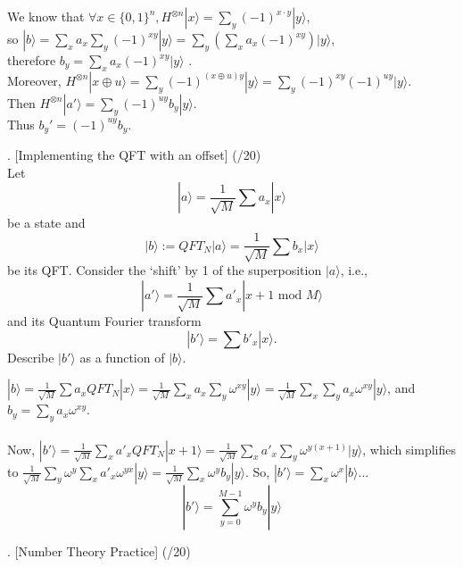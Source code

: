 \documentclass[11pt]{article}
\newenvironment{solution}{\begin{mdframed}[skipabove=\baselineskip,innertopmargin=\baselineskip,innerbottommargin=\baselineskip]
  }{\end{mdframed}}
\begin{document}
\begin{solution}
We know that $\forall x \in \{0,1\}^n,  H^{\otimes n}|x\rangle=\sum_y (-1)^{x\cdot y}|y\rangle$, \\ 
so $|b\rangle = \sum_x a_x \sum_y (-1)^{x y}|y\rangle 
= \sum_y (\sum_x a_x (-1)^{x y})|y\rangle$, \\
therefore $b_y = \sum_x a_x (-1)^{x y}|y\rangle$
. \vspace{2em} \\
Moreover, $H^{\otimes n}|x\oplus u\rangle = \sum_y (-1)^{(x\oplus u)y}|y\rangle = 
\sum_y (-1)^{xy}(-1)^{uy}|y\rangle$. \\
Then $H^{\otimes n}|a'\rangle = \sum_y (-1)^{uy}b_y|y\rangle$. \\ 
Thus $b_y' = (-1)^{uy}b_y$.

\end{solution}

\newpage

. [Implementing the QFT with an offset] (/20)
\\
Let
$$|a\rangle = \frac{1}{\sqrt{M}}\sum a_x|x\rangle$$
be a state and
$$|b\rangle := QFT_N|a\rangle = \frac{1}{\sqrt{M}}\sum b_x|x\rangle$$
be its QFT. Consider the ‘shift’ by 1 of the superposition $|a\rangle$, i.e.,
$$|a'\rangle = \frac{1}{\sqrt{M}}\sum a'_x|x+1\text{ mod }M\rangle$$
and its Quantum Fourier transform
$$|b'\rangle = \sum b'_x|x\rangle.$$
Describe $|b'\rangle$ as a function of $|b\rangle$. %

\begin{solution}
$|b\rangle = \frac{1}{\sqrt{M}}\sum a_x QFT_N|x\rangle = \frac{1}{\sqrt{M}}\sum_x a_x \sum_y\omega^{xy}|y\rangle = \frac{1}{\sqrt{M}}\sum_x \sum_y a_x \omega^{xy}|y\rangle$, and $b_y = \sum_y a_x \omega^{xy}$. \\\vspace{2em} \\ 
Now, $|b'\rangle =  \frac{1}{\sqrt{M}}\sum_x a'_x QFT_N|x+1\rangle = \frac{1}{\sqrt{M}}\sum_x a'_x  \sum_y \omega^{y(x+1)}|y\rangle$, which simplifies to $\frac{1}{\sqrt{M}}\sum_y \omega^y \sum_x a'_x  \omega^{yx}|y\rangle = \frac{1}{\sqrt{M}}\sum_x \omega^y b_y|y\rangle$. So, $|b'\rangle = \sum_x \omega^x |b\rangle$... $$ |b'\rangle = \sum_{y=0}^{M-1}\omega^y b_y|y\rangle$$
\end{solution}

\newpage

. [Number Theory Practice] (/20)
\end{document}
